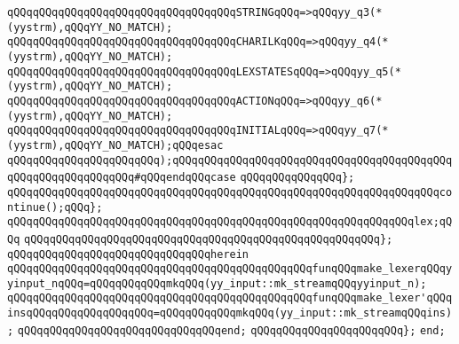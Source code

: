 \verb|qQQqqQQqqQQqqQQqqQQqqQQqqQQqqQQqqQQqSTRINGqQQq=>qQQqyy_q3(*(yystrm),qQQqYY_NO_MATCH);|\newline
\verb|qQQqqQQqqQQqqQQqqQQqqQQqqQQqqQQqqQQqCHARILKqQQq=>qQQqyy_q4(*(yystrm),qQQqYY_NO_MATCH);|\newline
\verb|qQQqqQQqqQQqqQQqqQQqqQQqqQQqqQQqqQQqLEXSTATESqQQq=>qQQqyy_q5(*(yystrm),qQQqYY_NO_MATCH);|\newline
\verb|qQQqqQQqqQQqqQQqqQQqqQQqqQQqqQQqqQQqACTIONqQQq=>qQQqyy_q6(*(yystrm),qQQqYY_NO_MATCH);|\newline
\verb|qQQqqQQqqQQqqQQqqQQqqQQqqQQqqQQqqQQqINITIALqQQq=>qQQqyy_q7(*(yystrm),qQQqYY_NO_MATCH);qQQqesac|\newline
\verb|qQQqqQQqqQQqqQQqqQQqqQQq);qQQqqQQqqQQqqQQqqQQqqQQqqQQqqQQqqQQqqQQqqQQqqQQqqQQqqQQqqQQqqQQq#qQQqendqQQqcase|\newline
\verb|qQQqqQQqqQQqqQQq};|\newline
\verb|qQQqqQQqqQQqqQQqqQQqqQQqqQQqqQQqqQQqqQQqqQQqqQQqqQQqqQQqqQQqqQQqqQQqcontinue();qQQq};|\newline
\newline
\verb|qQQqqQQqqQQqqQQqqQQqqQQqqQQqqQQqqQQqqQQqqQQqqQQqqQQqqQQqqQQqqQQqlex;qQQq|\newline
\verb|qQQqqQQqqQQqqQQqqQQqqQQqqQQqqQQqqQQqqQQqqQQqqQQqqQQqqQQq};|\newline
\verb|qQQqqQQqqQQqqQQqqQQqqQQqqQQqqQQqherein|\newline
\verb|qQQqqQQqqQQqqQQqqQQqqQQqqQQqqQQqqQQqqQQqqQQqqQQqfunqQQqmake_lexerqQQqyyinput_nqQQq=qQQqqQQqqQQqmkqQQq(yy_input::mk_streamqQQqyyinput_n);|\newline
\verb|qQQqqQQqqQQqqQQqqQQqqQQqqQQqqQQqqQQqqQQqqQQqqQQqfunqQQqmake_lexer'qQQqinsqQQqqQQqqQQqqQQqqQQq=qQQqqQQqqQQqmkqQQq(yy_input::mk_streamqQQqins);|\newline
\verb|qQQqqQQqqQQqqQQqqQQqqQQqqQQqqQQqend;|\newline
\newline
\verb|qQQqqQQqqQQqqQQqqQQqqQQq};|\newline
\verb|end;|\newline
\newline
\newline
\newline
\newline
\newline
\newline
\newline
\newline


